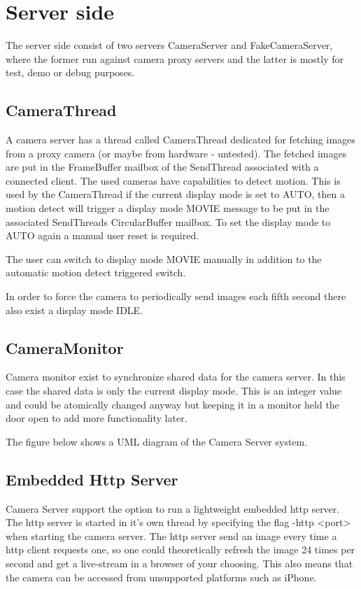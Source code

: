 \documentclass[8pt,titlepage]{article}
\begin{document}
\section{Server side}
The server side consist of two servers CameraServer and FakeCameraServer, where the former run against camera proxy servers and the latter is mostly for test, demo or debug purposes.



\subsection{CameraThread}
A camera server has a thread called CameraThread dedicated for fetching images from a proxy camera (or maybe from hardware - untested). The fetched images are put in the FrameBuffer mailbox of the SendThread associated with a connected client. The used cameras have capabilities to detect motion. This is used by the CameraThread if the current display mode is set to AUTO, then a motion detect will trigger a display mode MOVIE message to be put in the associated SendThreads CircularBuffer mailbox. To set the display mode to AUTO again a manual user reset is required. 

The user can switch to display mode MOVIE manually in addition to the automatic motion detect triggered switch.

In order to force the camera to periodically send images each fifth second there also exist a display mode IDLE.

\subsection{CameraMonitor}
Camera monitor exist to synchronize shared data for the camera server. In this case the shared data is only the current display mode. This is an integer value and could be atomically changed anyway but keeping it in a monitor held the door open to add more functionality later.

The figure below shows a UML diagram of the Camera Server system. 

\subsection{Embedded Http Server}
Camera Server support the option to run a lightweight embedded http server. The http server is started in it’s own thread by specifying the flag -http <port> when starting the camera server. The http server send an image every time a http client requests one, so one could theoretically refresh the image 24 times per second and get a live-stream in a browser of your choosing. This also means that the camera can be accessed from unsupported platforms such as iPhone.
\end{document}
